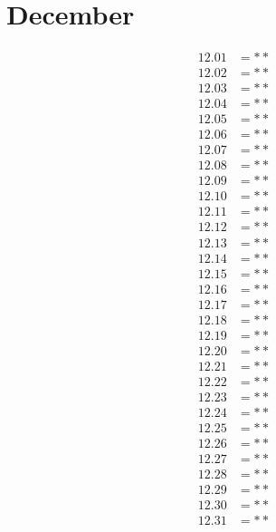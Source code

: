 \documentclass[12pt]{article}
\begin{document}
\pagebreak
 
\section{December}
\begin{align*}
12.01 &= **\\
12.02 &= **\\
12.03 &= **\\
12.04 &= **\\
12.05 &= **\\
12.06 &= **\\
12.07 &= **\\
12.08 &= **\\
12.09 &= **\\
12.10 &= **\\
12.11 &= **\\
12.12 &= **\\
12.13 &= **\\
12.14 &= **\\
12.15 &= **\\
12.16 &= **\\
12.17 &= **\\
12.18 &= **\\
12.19 &= **\\
12.20 &= **\\
12.21 &= **\\
12.22 &= **\\
12.23 &= **\\
12.24 &= **\\
12.25 &= **\\
12.26 &= **\\
12.27 &= **\\
12.28 &= **\\
12.29 &= **\\
12.30 &= **\\
12.31 &= **\\
\end{align*}
\end{document}
